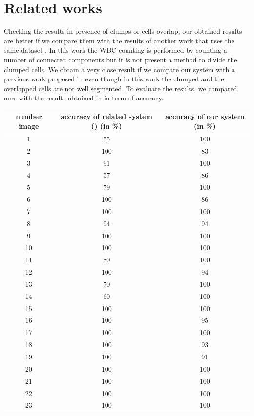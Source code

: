 \section{Related works}
Checking the results in presence of clumps or cells overlap, our obtained results are better if we compare them with the results of another work that uses the same dataset \cite{otherwork}. In this work the WBC counting is performed by counting a number of connected components but it is not present a method to divide the clumped cells. We obtain a very close result if we compare our system with a previous work proposed in \cite{dirub} even though in this work the clumped and the overlapped cells are not well segmented. To evaluate the results, we compared ours with the results obtained in \cite{water} in term of accuracy. 
\begin{table}
\begin{tabular}{|c|c|c|}
\hline
number image &  accuracy of related system (\cite{water}) (in \%) & accuracy of our system (in \%)\\ 
\hline
1 &  55 & 100 \\ 
\hline
2 &  100 & 83 \\ 
\hline 
3 &  91 & 100 \\ 
\hline
4 &  57 & 86 \\ 
\hline
5 &  79 & 100 \\ 
\hline
6 &  100 & 86 \\ 
\hline
7 &  100 & 100 \\ 
\hline
8 &  94 & 94 \\ 
\hline
9 &  100 & 100 \\ 
\hline
10 &  100 & 100 \\ 
\hline
11 &  80 & 100 \\ 
\hline
12 &  100 & 94 \\ 
\hline
13 &  70 & 100 \\ 
\hline
14 &  60 & 100 \\ 
\hline
15 &  100 & 100 \\ 
\hline
16 &  100 & 95 \\ 
\hline
17 &  100 & 100 \\ 
\hline
18 &  100 & 93 \\ 
\hline
19 &  100 & 91 \\ 
\hline
20 &  100 & 100 \\ 
\hline
21 &  100 & 100 \\ 
\hline
22 &  100 & 100 \\ 
\hline
23 &  100 & 100 \\ 

\end{tabular}
\end{table}
